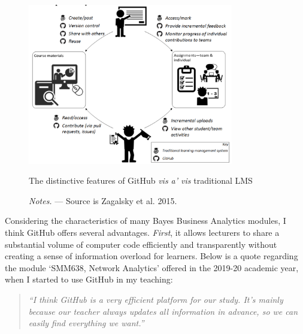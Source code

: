 \documentclass[a4paper,11pt]{book}
\begin{document}
\begin{appendices}
\begin{figure}
\centering
\includegraphics[width=0.8\textwidth]{github_features.png}
\caption{The distinctive features of GitHub \textit{vis a' vis} traditional LMS}
\vspace{-1em}
\caption*{\textit{Notes.} --- Source is Zagalsky et al. 2015.}
\label{fig:github_features}
\end{figure}

\quad Considering the characteristics of many Bayes Business Analytics modules, I think GitHub offers several advantages. \textit{First}, it allows lecturers to share a substantial volume of computer code efficiently and transparently without creating a sense of information overload for learners. Below is a quote regarding the module `SMM638, Network Analytics' offered in the 2019-20 academic year, when I started to use GitHub in my teaching:

\begin{quote}
\textit{``I think GitHub is a very efficient platform for our study. It's mainly because our teacher always updates all information in advance, so we can easily find everything we want.''}
\end{quote}


\end{appendices}
\end{document}
